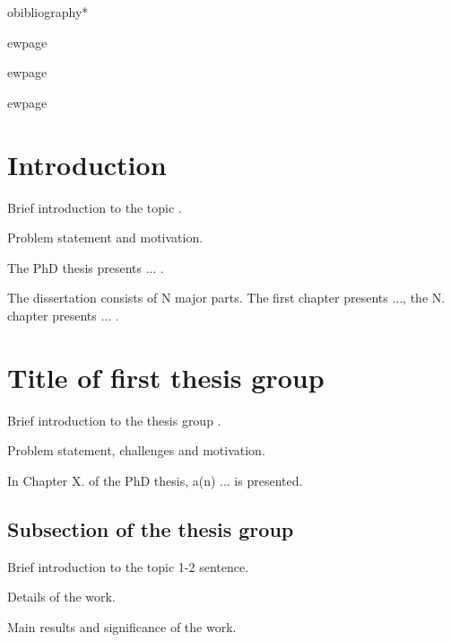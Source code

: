 \documentclass[12pt,a4paper]{extarticle}
\begin{document}
obibliography*


 

ewpage
\thispagestyle{empty}
\mbox{}


ewpage

\setcounter{page}{1}
 

ewpage
\section{Introduction}

Brief introduction to the topic \cite{b:arrl}. 

Problem statement and motivation.

The PhD thesis presents ... .

The dissertation consists of N major parts. The first chapter presents ..., the N. chapter presents ... .

\section{Title of first thesis group}

Brief introduction to the thesis group \cite{b:duckworth99}.

Problem statement, challenges and motivation.

In Chapter X. of the PhD thesis, a(n) ... is presented.

\subsection{Subsection of the thesis group}


Brief introduction to the topic 1-2 sentence.

Details of the work.

Main results and significance of the work.
\end{document}

